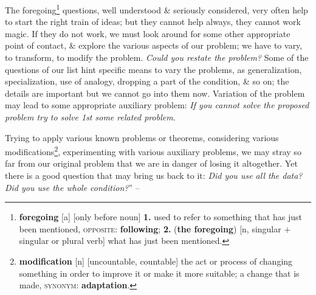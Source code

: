 \documentclass[oneside]{book}
\numberwithin{equation}{section}
\begin{document}
The foregoing\footnote{\textbf{foregoing} [a] [only before noun] \textbf{1.} used to refer to something that has just been mentioned, \textsc{opposite}: \textbf{following}; \textbf{2.} (\textbf{the foregoing}) [n, singular $+$ singular or plural verb] what has just been mentioned.} questions, well understood \& seriously considered, very often help to start the right train of ideas; but they cannot help always, they cannot work magic. If they do not work, we must look around for some other appropriate point of contact, \& explore the various aspects of our problem; we have to vary, to transform, to modify the problem. \textit{Could you restate the problem?} Some of the questions of our list hint specific means to vary the problems, as generalization, specialization, use of analogy, dropping a part of the condition, \& so on; the details are important but we cannot go into them now. Variation of the problem may lead to some appropriate auxiliary problem: \textit{If you cannot solve the proposed problem try to solve 1st some related problem}.

Trying to apply various known problems or theorems, considering various modifications\footnote{\textbf{modification} [n] [uncountable, countable] the act or process of changing something in order to improve it or make it more suitable; a change that is made, \textsc{synonym}: \textbf{adaptation}.}, experimenting with various auxiliary problems, we may stray so far from our original problem that we are in danger of losing it altogether. Yet there is a good question that may bring us back to it: \textit{Did you use all the data? Did you use the whole condition?}'' -- \cite[pp. 8--9]{Polya2014}
\end{document}
